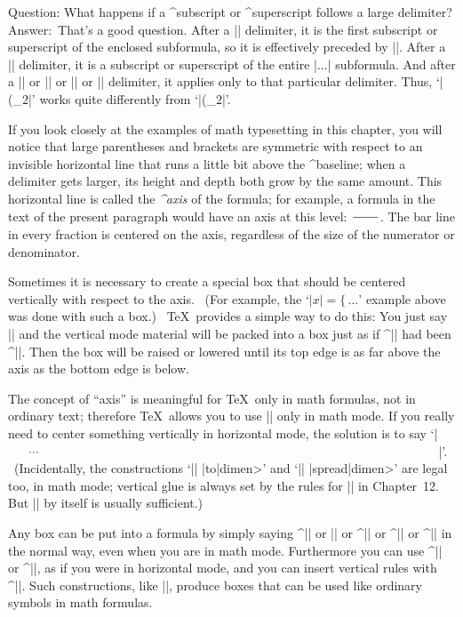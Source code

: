 \ddanger Question: What happens if a ^{subscript} or ^{superscript}
follows a large delimiter? Answer:~That's a good question. After a |\left|
delimiter, it is the first subscript or superscript of the enclosed
subformula, so it is effectively preceded by |{}|. After a |\right|
delimiter, it is a subscript or superscript of the entire |\left...\right|
subformula. And after a |\bigl| or |\bigr| or |\bigm| or |\big| delimiter,
it applies only to that particular delimiter. Thus, `|\bigl(_2|' works
quite differently from `|\left(_2|'.

\danger If you look closely at the examples of math typesetting in this
chapter, you will notice that large parentheses and brackets are
symmetric with respect to an invisible horizontal line that runs a little
bit above the ^{baseline}; when a delimiter gets larger, its height and
depth both grow by the same amount. This horizontal line is called the
{\sl^{axis}\/} of the formula; for example, a formula in the text of the
present paragraph would have an axis at this level: $\hskip 2em\over$. The
bar line in every fraction is centered on the axis, regardless of the size
of the numerator or denominator.

\danger Sometimes it is necessary to create a special box that should be
centered vertically with respect to the axis. \ (For example, the
`$\vert x\vert=\bigl\{\,\ldots$' example above was done with such a box.) \
\TeX\ provides a simple way to do this: You just say
\begindisplay
||
\enddisplay
and the vertical mode material will be packed into a box just as if
^|\vcenter| had been ^|\vbox|. Then the box will be raised or lowered until
its top edge is as far above the axis as the bottom edge is below.

\ddanger The concept of ``axis'' is meaningful for \TeX\ only in math
formulas, not in ordinary text; therefore \TeX\ allows you to use
|\vcenter| only in math mode. If you really need to center something
vertically in horizontal mode, the solution is to say `|$\vcenter{...}$|'.
 \ (Incidentally, the constructions `|\vcenter| |to|\<dimen>'
and `|\vcenter| |spread|\<dimen>' are legal too, in math mode;
vertical glue is always set by the rules for |\vbox| in
Chapter~12. But |\vcenter| by itself is usually sufficient.)

\danger Any box can be put into a formula by simply saying ^|\hbox| or
|\vbox| or ^|\vtop| or ^|\box| or ^|\copy| in the normal way, even when
you are in math mode.  Furthermore you can use ^|\raise| or ^|\lower|, as
if you were in horizontal mode, and you can insert vertical rules with
^|\vrule|.  Such constructions, like |\vcenter|, produce boxes that can be
used like ordinary symbols in math formulas.

